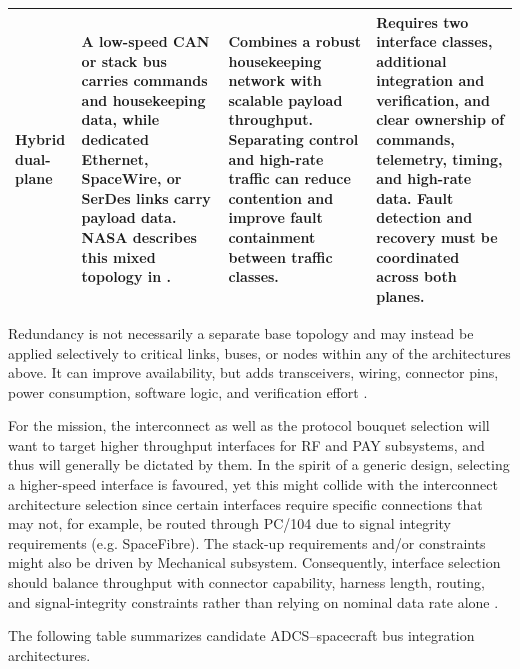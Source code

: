 \documentclass[10pt]{../datasheet}
\let\cite\citep
\begin{document}
\begin{longtable}{|
  >{\raggedright\arraybackslash}p{3.0cm}|
  >{\raggedright\arraybackslash}p{4.5cm}|
  >{\raggedright\arraybackslash}p{4.1cm}|
  >{\raggedright\arraybackslash}p{4.0cm}|}
  Hybrid dual-plane                                              &
  A low-speed CAN or stack bus carries commands and housekeeping data, while
  dedicated Ethernet, SpaceWire, or SerDes links carry payload data. NASA
  describes this mixed topology in
  \cite[pp.~222--223]{nasa_soa_2026}.                            &
  Combines a robust housekeeping network with scalable payload throughput.
  Separating control and high-rate traffic can reduce contention and improve
  fault containment between traffic classes.                     &
  Requires two interface classes, additional integration and verification, and
  clear ownership of commands, telemetry, timing, and high-rate data. Fault
  detection and recovery must be coordinated across both planes.                        \\ \hline
\end{longtable}

Redundancy is not necessarily a separate base topology and may instead be
applied selectively to critical links, buses, or nodes within any of the
architectures above. It can improve availability, but adds transceivers,
wiring, connector pins, power consumption, software logic, and verification
effort \cite{nasa_soa_2026,ecss_canbus}.

For the mission, the interconnect as well as the protocol bouquet selection will
want to target higher throughput interfaces for RF and PAY subsystems, and thus
will generally be dictated by them. In the spirit of a generic design, selecting
a higher-speed interface is favoured, yet this might collide with the
interconnect architecture selection since certain interfaces require specific
connections that may not, for example, be routed through PC/104 due to signal
integrity requirements (e.g. SpaceFibre). The stack-up requirements and/or
constraints might also be driven by Mechanical subsystem.
Consequently, interface selection should balance throughput with connector
capability, harness length, routing, and signal-integrity constraints rather
than relying on nominal data rate alone \cite{ecss_spacewire,ecss_spacefibre}.


The following table summarizes candidate ADCS–spacecraft bus integration architectures.
\end{document}
